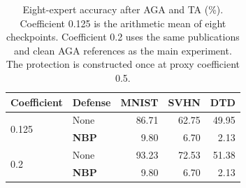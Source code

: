 \begin{table}[!t]
\centering
\small
\setlength{\tabcolsep}{4pt}
\caption{Eight-expert accuracy after AGA and TA (\%). Coefficient 0.125 is the arithmetic mean of eight checkpoints. Coefficient 0.2 uses the same publications and clean AGA references as the main experiment. The protection is constructed once at proxy coefficient 0.5.}
\label{tab:equal-weight}
\begin{tabular}{llrrr}
\toprule
Coefficient & Defense & MNIST & SVHN & DTD \\
\midrule
\multirow{2}{*}{0.125} & None & 86.71 & 62.75 & 49.95 \\
 & \textbf{NBP} & 9.80 & 6.70 & 2.13 \\
\midrule
\multirow{2}{*}{0.2} & None & 93.23 & 72.53 & 51.38 \\
 & \textbf{NBP} & 9.80 & 6.70 & 2.13 \\
\bottomrule
\end{tabular}
\end{table}

